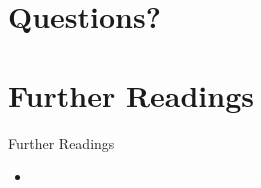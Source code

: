 %
%
%

\section{Questions?}

\section{Further Readings}%
\label{sec:further_readings}


\begin{frame}[t]{Further Readings}
	\begin{itemize}
		\item {}
	\end{itemize}
\end{frame}


